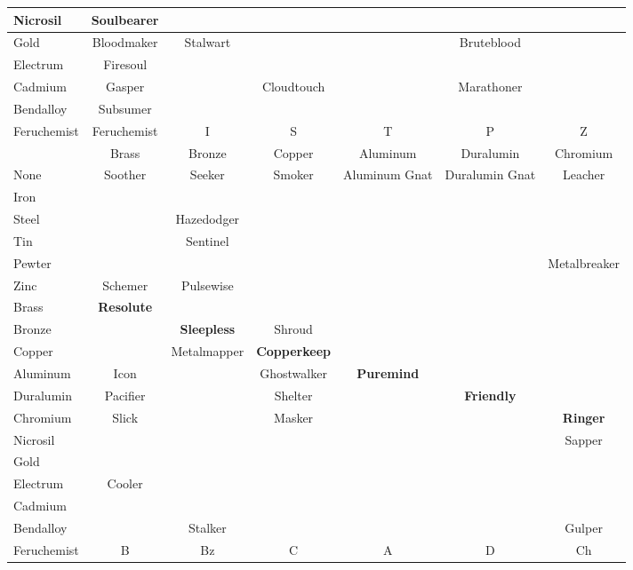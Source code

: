 \documentclass[conference]{IEEEtran}
\begin{document}
\begin{table}[h]
\begin{center}
\begin{tabular}{|l |c |c |c |c |c |c | }
		Nicrosil&\cellcolor{darkgreen}Soulbearer&&&&& \\\hline
		Gold&\cellcolor{darkgreen}Bloodmaker&\cellcolor{lightgreen}Stalwart&&&\cellcolor{lightgreen}Bruteblood& \\\hline
		Electrum&\cellcolor{orange}Firesoul& & & & &  \\\hline
		Cadmium&\cellcolor{darkgreen}Gasper&&\cellcolor{lightgreen}Cloudtouch&&\cellcolor{lightgreen}Marathoner& \\\hline
		Bendalloy&\cellcolor{darkgreen}Subsumer&&&&& \\\hline
		Feruchemist&\cellcolor{darkgreen}Feruchemist&I&S&T&P&Z \\\hline
		\hline
		
		\cellcolor{black}&Brass&Bronze&Copper&Aluminum&Duralumin&Chromium\\\hline 
		
		\hline
		None	&\cellcolor{darkgreen}\cellcolor{darkgreen}Soother& \cellcolor{darkgreen}Seeker&\cellcolor{darkgreen}Smoker&\cellcolor{darkgreen}Aluminum Gnat&\cellcolor{darkgreen}Duralumin Gnat&\cellcolor{darkgreen}Leacher\\\hline
		
		Iron	& & & & & & \\\hline
		Steel	& &\cellcolor{lightgreen}Hazedodger& & & & \\\hline
		Tin& &\cellcolor{lightgreen}Sentinel& & & & \\\hline
		Pewter& & && & &\cellcolor{lightgreen}Metalbreaker\\\hline
		Zinc&\cellcolor{lightgreen} Schemer&  \cellcolor{lightgreen}Pulsewise&& & &\\\hline
		Brass&\cellcolor{lightred}\textbf{Resolute}& && & &\\\hline
		Bronze& &\cellcolor{lightgreen}\textbf{Sleepless}& \cellcolor{lightgreen}Shroud & & & \\\hline
		Copper& & \cellcolor{lightgreen}Metalmapper& \cellcolor{lightgreen}\textbf{Copperkeep}& & & \\\hline
		Aluminum& \cellcolor{lightgreen}Icon & & \cellcolor{lightgreen}Ghostwalker & \cellcolor{lightgreen}\textbf{Puremind} & &\\\hline
		Duralumin& \cellcolor{lightgreen}Pacifier && \cellcolor{lightgreen}Shelter  &&\cellcolor{lightgreen} \textbf{Friendly}& \\\hline
		Chromium&\cellcolor{lightgreen}Slick&&\cellcolor{lightgreen}Masker&  &  &\cellcolor{lightgreen} \textbf{Ringer}\\\hline
		Nicrosil&&&&  &  & \cellcolor{lightgreen}Sapper \\\hline
		Gold&&&&&&\\\hline
		Electrum&\cellcolor{lightorange}Cooler && &&  &    \\\hline
		Cadmium& & &&  &  &  \\\hline
		Bendalloy&&\cellcolor{lightgreen}Stalker&&&  &\cellcolor{lightgreen}Gulper  \\\hline
		Feruchemist&B&Bz&C& A & D & Ch \\\hline			\hline
		

\end{tabular}
\end{center}
\end{table}
\end{document}
